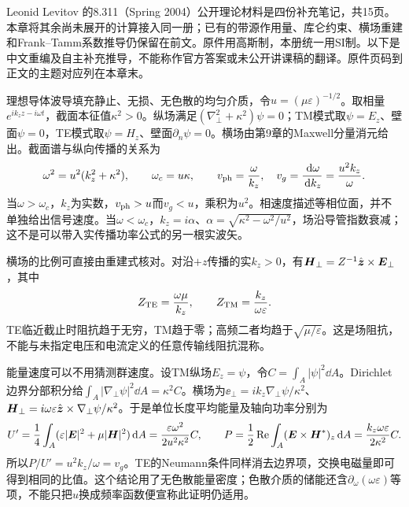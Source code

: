 \label{ch:gradpublic}
Leonid Levitov 的8.311（Spring 2004）公开理论材料是四份补充笔记，共15页。本章将其余尚未展开的计算接入同一册；已有的带源作用量、库仑约束、横场重建和Frank--Tamm系数推导仍保留在前文。原件用高斯制，本册统一用SI制。以下是中文重编及自主补充推导，不能称作官方答案或未公开讲课稿的翻译。原件页码到正文的主题对应列在本章末。

理想导体波导填充静止、无损、无色散的均匀介质，令$u=(\mu\varepsilon)^{-1/2}$。取相量$e^{ik_zz-i\omega t}$，截面本征值$\kappa^2>0$。纵场满足$(\nabla_\perp^2+\kappa^2)\psi=0$；TM模式取$\psi=E_z$、壁面$\psi=0$，TE模式取$\psi=H_z$、壁面$\partial_n\psi=0$。横场由第9章的Maxwell分量消元给出。截面谱与纵向传播的关系为
\[
 \omega^2=u^2(k_z^2+\kappa^2),\qquad
 \omega_c=u\kappa,\qquad
 v_{\rm ph}=\frac\omega{k_z},\quad
 v_g=\frac{\,\mathrm d\omega}{\,\mathrm d k_z}=\frac{u^2k_z}\omega.
\]
当$\omega>\omega_c$，$k_z$为实数，$v_{\rm ph}>u$而$v_g<u$，乘积为$u^2$。相速度描述等相位面，并不单独给出信号速度。当$\omega<\omega_c$，$k_z=i\alpha$、$\alpha=\sqrt{\kappa^2-\omega^2/u^2}$，场沿导管指数衰减；这不是可以带入实传播功率公式的另一根实波矢。

横场的比例可直接由重建式核对。对沿$+z$传播的实$k_z>0$，有$\boldsymbol{H}_\perp=Z^{-1}\hat{\boldsymbol{z}}\times\boldsymbol{E}_\perp$，其中
\[
 Z_{\rm TE}=\frac{\omega\mu}{k_z},\qquad
 Z_{\rm TM}=\frac{k_z}{\omega\varepsilon}.
\]
TE临近截止时阻抗趋于无穷，TM趋于零；高频二者均趋于$\sqrt{\mu/\varepsilon}$。这是场阻抗，不能与未指定电压和电流定义的任意传输线阻抗混称。

能量速度可以不用猜测群速度。设TM纵场$E_z=\psi$，令$C=\int_A|\psi|^2\dd A$。Dirichlet边界分部积分给$\int_A|\nabla_\perp\psi|^2\dd A=\kappa^2C$。横场为$\ee_\perp=ik_z\nabla_\perp\psi/\kappa^2$、$\boldsymbol{H}_\perp=i\omega\varepsilon\hat{\boldsymbol{z}}\times\nabla_\perp\psi/\kappa^2$。于是单位长度平均能量及轴向功率分别为
\[
 U'=\frac14\int_A(\varepsilon|\boldsymbol{E}|^2+\mu|\boldsymbol{H}|^2)\,\mathrm d A
 =\frac{\varepsilon\omega^2}{2u^2\kappa^2}C,
 \qquad
 P=\frac12\operatorname{Re}\int_A(\boldsymbol{E}\times\boldsymbol{H}^*)_z\,\mathrm d A
 =\frac{k_z\omega\varepsilon}{2\kappa^2}C.
\]
所以$P/U'=u^2k_z/\omega=v_g$。TE的Neumann条件同样消去边界项，交换电磁量即可得到相同的比值。这个结论用了无色散能量密度；色散介质的储能还含$\partial_\omega(\omega\varepsilon)$等项，不能只把$u$换成频率函数便宣称此证明仍适用。

